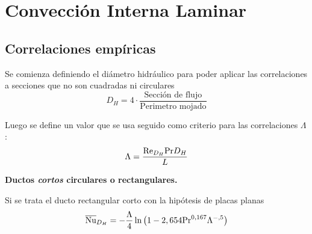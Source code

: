 \section{Convección Interna Laminar}
\subsection{Correlaciones empíricas}

Se comienza definiendo el diámetro hidráulico para poder aplicar las correlaciones a secciones que no son cuadradas ni circulares
\begin{equation}
    D_H=4\cdot \frac{\textrm{Sección de flujo}}{\textrm{Perimetro mojado}}
\end{equation}

Luego se define un valor que se usa seguido como criterio para las correlaciones $\Lambda$:
\[
\Lambda = \frac{\textrm{Re}_{D_H}\textrm{Pr} D_H}{L}
\]

{\bf Ductos \emph{cortos} circulares o rectangulares.}

Si se trata el ducto rectangular corto con la hipótesis de placas planas
\begin{equation}
    \overline{\textrm{Nu}}_{D_H}=-\frac{\Lambda}{4}\ln \left( 1 - 2,654 \textrm{Pr}^{0,167} \Lambda^{-,5}\right)
\end{equation}
